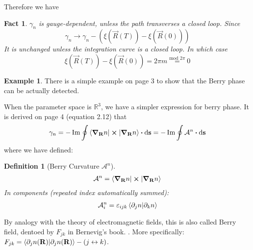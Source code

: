\documentclass{article}
\numberwithin{equation}{subsection} %
\newtheorem{defi}{Definition}[section]
\newtheorem{fact}{Fact}[section]
\theoremstyle{definition}
\newtheorem{ex}{Example}[section]
\begin{document}
Therefore we have
\begin{fact}
    $\gamma_n$ is gauge-dependent, unless the path transverses a
    closed loop.
    Since 
    $$ \gamma_n \to \gamma_n - \left(\xi(\vec{R}(T))-
    \xi(\vec{R}(0)) \right) $$
    It is unchanged unless the integration curve is a closed loop. In
    which case
    $$\xi(\vec{R}(T)) - \xi(\vec{R}(0)) = 2\pi m
    \overset{\text{mod }2\pi}{=} 0 $$
\end{fact}
\begin{ex}
    There is a simple example on page 3 to show that the Berry phase
    can be actually detected.
\end{ex}

When the parameter space is $\mathbb{R}^3$, we have a simpler
expression for berry phase. It is derived on page 4 (equation 2.12)
that
\begin{align}
    \gamma_n = -\Im \oint \braket{\grad_{\vb{R}}
    n|\cross|\grad_{\vb{R}} n} \vdot \dd \vb{s}
    = -\Im \oint \mathcal{A}^n \vdot \dd\vb{s}
\end{align}
where we have defined:
\begin{defi}[Berry Curvature $\mathcal{A}^n$]
    \begin{align}
        \mathcal{A}^n = \braket{\grad_{\vb{R}} n|\cross|\grad_{\vb{R}} n}
    \end{align}
    In components (repeated index automatically summed):
    \begin{align}
        \mathcal{A}_i^n = \varepsilon_{ijk} \braket{\partial_j n |
        \partial_k n}
    \end{align}
\end{defi}
By analogy with the theory of electromagnetic fields, this is also
called Berry field, dentoed by $F_{jk}$ in Bernevig's book.
. More specifically:
$F_{jk} = \braket{\partial_j n(\vb{R})|\partial_j n(\vb{R})} - (j
    \leftrightarrow k) $.
\end{document}
